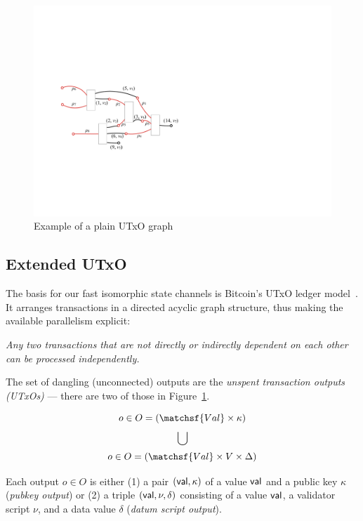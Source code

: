 \begin{figure}[t]
  \centering
  \includegraphics[scale=.2,width=\textwidth/2]{figures/utxo-graph.pdf}
  \caption{Example of a plain UTxO graph}
  \label{fig:utxo-graph}
\end{figure}

\subsection{Extended UTxO}
The basis for our fast isomorphic state channels is Bitcoin's UTxO ledger model~\cite{formal-model-of-bitcoin-transactions,Zahnentferner18-UTxO}. It arranges transactions in a directed acyclic graph structure, thus making the available parallelism explicit: 

\emph{Any two transactions that are not directly or indirectly dependent on each other can be processed independently.}

The set of dangling (unconnected) outputs are the \emph{unspent transaction outputs (UTxOs)} --- there are two of those in Figure~\ref{fig:utxo-graph}. 

\begin{definition}[Outputs]
$$
o \in O = (\matchsf{Val} \times \kappa)
$$
$$\bigcup$$
$$
o \in O = (\matchsf{Val} \times V \times \Delta)
$$

Each output \(o\in O\) is either (1) a pair \((\mathsf{val}, \kappa)\)
of a value $\mathsf{val}$ and a public key $\kappa$ (\emph{pubkey
output}) or (2) a triple \((\mathsf{val}, \nu, \delta)\) consisting of a value
$\mathsf{val}$, a validator script $\nu$, and a data value $\delta$ (\emph{datum script output}).
\end{definition}

